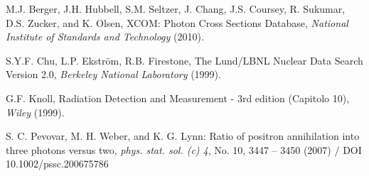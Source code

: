 \begin{thebibliography}{99}

M.J. Berger, J.H. Hubbell, S.M. Seltzer, J. Chang, J.S. Coursey, R. Sukumar, D.S. Zucker, and K. Olsen, XCOM: Photon Cross Sections Database, \emph{National Institute of Standards and Technology} (2010).

S.Y.F. Chu, L.P. Ekström, R.B. Firestone, The Lund/LBNL Nuclear Data Search Version 2.0, \emph{Berkeley National Laboratory} (1999).

G.F. Knoll, Radiation Detection and Measurement - 3rd edition (Capitolo 10), \emph{Wiley} (1999).

S. C. Pevovar, M. H. Weber, and K. G. Lynn: Ratio of positron annihilation into three photons versus two,
\emph{phys. stat. sol. (c) 4}, No. 10, 3447 – 3450 (2007) / DOI 10.1002/pssc.200675786

\end{thebibliography}